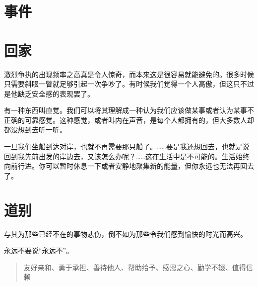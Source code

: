 \documentclass[fontset=founder]{ctexart}
\begin{document}
\section{事件}

\section{回家}

激烈争执的出现频率之高真是令人惊奇，而本来这是很容易就能避免的。很多时候只需要斜眼一瞥就足够引起一次争吵了。有时候我们觉得一个人高傲，但这只不过是他缺乏安全感的表现罢了。

有一种东西叫直觉。我们可以将其理解成一种认为我们应该做某事或者认为某事不正确的可靠感觉。这种感觉，或者叫内在声音，是每个人都拥有的，但大多数人却都没想到去听一听。

一旦我们坐船到达对岸，也就不再需要那只船了。……要是我还想回去，也就是说回到我先前出发的岸边去，又该怎么办呢？……这在生活中是不可能的。生活始终向前行进。你可以暂时休息一下或者安静地聚集新的能量，但你永远也无法再回去了。

\section{道别}

与其为那些已经不在的事物悲伤，倒不如为那些令我们感到愉快的时光而高兴。

永远不要说“永远不”。

\begin{quote}
    友好亲和、勇于承担、善待他人、帮助给予、感恩之心、勤学不辍、值得信赖
\end{quote}
\end{document}
